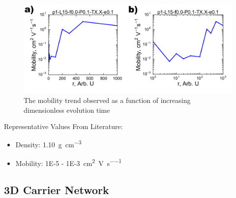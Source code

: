 \documentclass[12pt]{article}
\def\mobunits{\square\centi\meter\per\volt\per\second}
\def\gcm{\gram\per\cubic\centi\meter}
\begin{document}
\begin{figure}[h!]\centering
	\includegraphics[width=\textwidth]{Figures/HoleMob.pdf}
    \caption{The mobility trend observed as a function of increasing dimensionless evolution time}
	\label{fig:MSD}
\end{figure}

Representative Values From Literature:
\begin{itemize}
    \item{Density: \SI{1.10}{\gcm}\cite{Newbloom2012a}}
\item{Mobility: \SI{1E-5}{} - \SI{1E-3}{\mobunits}\cite{Ballantyne2008b,Mauer2010,Pandey2000,Kim2006}}
\end{itemize}

\clearpage

\subsection{3D Carrier Network}
\end{document}
